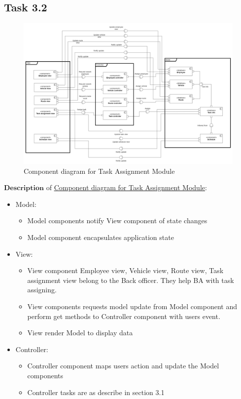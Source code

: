 \documentclass[a4paper]{article}
\begin{document}
\subsection{Task 3.2}
\hypertarget{component}{
\begin{figure}
\hspace{-3cm}
  \includegraphics[width=1.4\linewidth]{component.png}
  \caption{Component diagram for Task Assignment Module}
\end{figure}}


$\textbf{Description}$ of \hyperlink{component}{Component diagram for Task Assignment Module}: 
\begin{itemize}
    \item Model:
    \begin{itemize}
        \item Model components notify View component of state changes
        \item Model component encapsulates application state    
    \end{itemize}

    \item View:
    \begin{itemize}
        \item View component Employee view, Vehicle view, Route view, Task assignment view belong to the Back officer. They help BA with task assigning.
        \item View components requests model update from Model component and perform get methods to Controller component with users event.
        \item View render Model to display data
    \end{itemize}

    \item Controller:
    \begin{itemize}
        \item Controller component maps users action and update the Model components
        \item Controller tasks are as describe in section 3.1
    \end{itemize}
\end{itemize}

\begin{thebibliography}{80}

\end{thebibliography}
\end{document}
